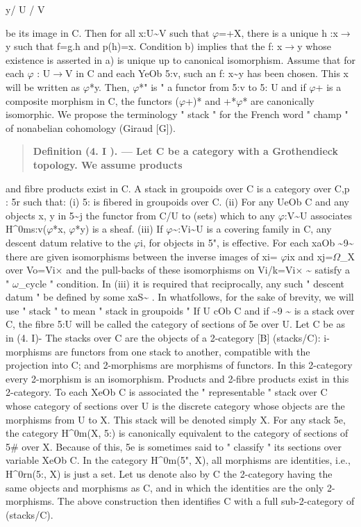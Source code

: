 \documentclass[11pt]{article}
\theoremstyle{plain}
\theoremstyle{definition}
\theoremstyle{remark}
\begin{document}
y/ U / V

be its image in C. Then for all x:U\textasciitilde{}V such that $\varphi$=+X, there is a unique h :x$\to$y such that f=g.h and p(h)=x. Condition b) implies that the f: x$\to$y whose existence is asserted in a) is unique up to canonical isomorphism. Assume that for each $\varphi$ : U$\to$V in C and each YeOb 5:v, such an f: x\textasciitilde{}y has been chosen. This x will be written as $\varphi$*y. Then, $\varphi$*" is " a functor from 5:v to 5: U and if $\varphi$+ is a composite morphism in C, the functors ($\varphi$+)* and +*$\varphi$* are canonically isomorphic. We propose the terminology " stack " for the French word " champ " of nonabelian cohomology (Giraud [G]).

\begin{quote}\textbf{Definition (4. I ). --- Let C be a category with a Grothendieck topology. We assume products}\end{quote}
and fibre products exist in C. A stack in groupoids over C is a category over C,p : 5r such that: (i) 5: is fibered in groupoids over C. (ii) For any UeOb C and any objects x, y in 5\textasciitilde{}j the functor from C/U to (sets) which to any $\varphi$:V\textasciitilde{}U associates H\textasciicircum{}0ms:v($\varphi$*x, $\varphi$*y) is a sheaf. (iii) If $\varphi$\textasciitilde{}:Vi\textasciitilde{}U is a covering family in C, any descent datum relative to the $\varphi$i, for objects in 5", is effective. For each xaOb \textasciitilde{}9\textasciitilde{} there are given isomorphisms between the inverse images of xi= $\varphi$ix and xj=$\Omega$\_X over Vo=Vi$\times$ and the pull-backs of these isomorphisms on Vi/k=Vi$\times$ \textasciitilde{} satisfy a " $\omega$\_cycle " condition. In (iii) it is required that reciprocally, any such " descent datum " be defined by some xaS\textasciitilde{} . In whatfollows, for the sake of brevity, we will use " stack " to mean " stack in groupoids " If U cOb C and if \textasciitilde{}9 \textasciitilde{} is a stack over C, the fibre 5:U will be called the category of sections of 5e over U. Let C be as in (4. I)- The stacks over C are the objects of a 2-category [B] (stacks/C): i-morphisms are functors from one stack to another, compatible with the projection into C; and 2-morphisms are morphisms of functors. In this 2-category every 2-morphism is an isomorphism. Products and 2-fibre products exist in this 2-category. To each XeOb C is associated the " representable " stack over C whose category of sections over U is the discrete category whose objects are the morphisms from U to X. This stack will be denoted simply X. For any stack 5e, the category H\textasciicircum{}0m(X, 5:) is canonically equivalent to the category of sections of 5\# over X. Because of this, 5e is sometimes said to " classify " its sections over variable XeOb C. In the category H\textasciicircum{}0m(5", X), all morphisms are identities, i.e., H\textasciicircum{}0rn(5:, X) is just a set. Let us denote also by C the 2-category having the same objects and morphisms as C, and in which the identities are the only 2-morphisms. The above construction then identifies C with a full sub-2-category of (stacks/C).
\end{document}

